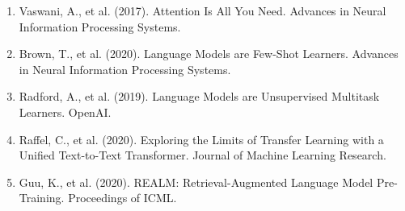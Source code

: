 \documentclass[10pt]{article}
\begin{document}
\begin{enumerate}[leftmargin=*,label={\arabic*.}]
\item Vaswani, A., et al. (2017). Attention Is All You Need. Advances in Neural Information Processing Systems.
\item Brown, T., et al. (2020). Language Models are Few-Shot Learners. Advances in Neural Information Processing Systems.
\item Radford, A., et al. (2019). Language Models are Unsupervised Multitask Learners. OpenAI.
\item Raffel, C., et al. (2020). Exploring the Limits of Transfer Learning with a Unified Text-to-Text Transformer. Journal of Machine Learning Research.
\item Guu, K., et al. (2020). REALM: Retrieval-Augmented Language Model Pre-Training. Proceedings of ICML.
\end{enumerate}
\end{document}
